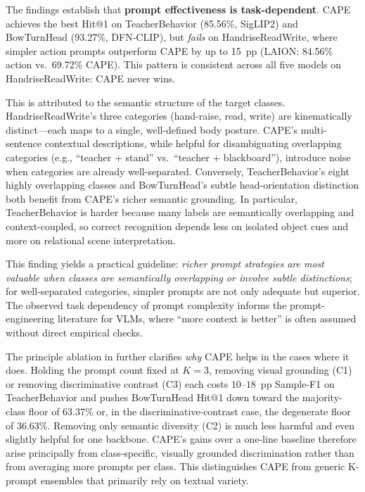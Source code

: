 \documentclass[electronics,article,submit,pdftex,moreauthors]{Definitions/mdpi}
\begin{document}
The findings establish that \textbf{prompt effectiveness is task-dependent}.
CAPE achieves the best Hit@1 on TeacherBehavior (85.56\%, SigLIP2) and BowTurnHead (93.27\%, DFN-CLIP), but \textit{fails} on HandriseReadWrite, where simpler action prompts outperform CAPE by up to 15~pp (LAION: 84.56\% action vs.\ 69.72\% CAPE).
This pattern is consistent across all five models on HandriseReadWrite: CAPE never wins.

This is attributed to the semantic structure of the target classes.
HandriseReadWrite's three categories (hand-raise, read, write) are kinematically distinct---each maps to a single, well-defined body posture.
CAPE's multi-sentence contextual descriptions, while helpful for disambiguating overlapping categories (e.g., ``teacher + stand'' vs.\ ``teacher + blackboard''), introduce noise when categories are already well-separated.
Conversely, TeacherBehavior's eight highly overlapping classes and BowTurnHead's subtle head-orientation distinction both benefit from CAPE's richer semantic grounding.
In particular, TeacherBehavior is harder because many labels are semantically overlapping and context-coupled, so correct recognition depends less on isolated object cues and more on relational scene interpretation.

This finding yields a practical guideline: \emph{richer prompt strategies are most valuable when classes are semantically overlapping or involve subtle distinctions}; for well-separated categories, simpler prompts are not only adequate but superior.
The observed task dependency of prompt complexity informs the prompt-engineering literature for VLMs, where ``more context is better'' is often assumed without direct empirical checks.

The principle ablation in  further clarifies \emph{why} CAPE helps in the cases where it does. Holding the prompt count fixed at $K=3$, removing visual grounding (\textsc{C1}) or removing discriminative contrast (\textsc{C3}) each costs $10$--$18$~pp Sample-F1 on TeacherBehavior and pushes BowTurnHead Hit@1 down toward the majority-class floor of $63.37\%$ or, in the discriminative-contrast case, the degenerate floor of $36.63\%$. Removing only semantic diversity (\textsc{C2}) is much less harmful and even slightly helpful for one backbone. CAPE's gains over a one-line baseline therefore arise principally from class-specific, visually grounded discrimination rather than from averaging more prompts per class. This distinguishes CAPE from generic K-prompt ensembles that primarily rely on textual variety.
\end{document}
